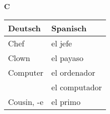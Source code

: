 \begin{flushright}\begin{Huge}\textbf{C}\end{Huge}\end{flushright}

\begin{longtable}{p{} p{}} 
\textbf{Deutsch}     & \textbf{Spanisch}                                       \\ \hline
\hline
\endhead %
Chef & el jefe\\
Clown & el payaso \\
Computer & el ordenador \\
~ & el computador \\

Cousin, -e & el primo \\
\end{longtable}
